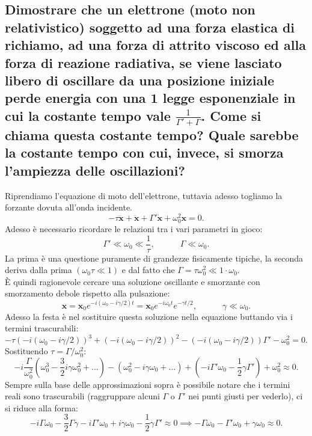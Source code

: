 \subsection[]{Dimostrare che un elettrone (moto non relativistico) soggetto ad una forza elastica di richiamo, ad una forza di attrito viscoso ed alla forza di reazione radiativa, se viene lasciato libero di oscillare da una posizione iniziale perde energia con una 1 legge esponenziale in cui la costante tempo vale $\frac{1}{\Gamma' + \Gamma}$. Come si chiama questa costante tempo? Quale sarebbe la costante tempo con cui, invece, si smorza l'ampiezza delle oscillazioni?}
Riprendiamo l'equazione di moto dell'elettrone, tuttavia adesso togliamo la forzante dovuta all'onda incidente.
\[
	- \tau \dddot{\boldsymbol{x}} + \ddot{\boldsymbol{x}} + \Gamma' \dot{\boldsymbol{x}} + \omega_0^2 \boldsymbol{x} = 0 
.\]  
Adesso è necessario ricordare le relazioni tra i vari parametri in gioco:
\[
	\Gamma' \ll \omega_0 \ll \frac{1}{\tau}, \quad \quad \quad  
	\Gamma \ll \omega_0
.\] 
La prima è una questione puramente di grandezze fisicamente tipiche, la seconda deriva dalla prima $\left( \omega_0 \tau \ll 1 \right) $ e dal fatto che $\Gamma = \tau \omega_0^2 \ll 1 \cdot \omega_0$.\\
È quindi ragionevole cercare una soluzione oscillante e smorzante con smorzamento debole rispetto alla pulsazione:
\[
	\boldsymbol{x} = \boldsymbol{x}_0 e^{-i\left( \omega_0 - i \gamma/2 \right)t } = \boldsymbol{x}_0 e^{-i \omega_0t} e^{-\gamma t /2}, \quad \quad \quad 
	\gamma \ll \omega_0
.\]
Adesso la festa è nel sostituire questa soluzione nella equazione buttando via i termini trascurabili:
\[
	- \tau \left( -i\left( \omega_0 - i \gamma /2 \right)  \right)^3 + \left( -i\left( \omega_0 - i \gamma /2 \right) \right)^2 - \left( -i\left( \omega_0 - i \gamma /2 \right) \right) \Gamma' - \omega_0^2 = 0 
.\]
Sostituendo $\tau = \Gamma / \omega_0^2$:
\[
	-i \frac{\Gamma}{\omega_0^2}\left( \omega_0^3 - \frac{3}{2} i \gamma \omega_0^2 + \ldots \right) - \left( \omega_0^2 - i \gamma \omega_0 + \ldots \right) + 
	\left( -i \Gamma' \omega_0 - \frac{1}{2} \gamma \Gamma'  \right) + \omega_0^2 \approx 0 
.\] 
Sempre sulla base delle approssimazioni sopra è possibile notare che i termini reali sono trascurabili (raggruppare alcuni $\Gamma$ o $\Gamma'$ nei punti giusti per vederlo), ci si riduce alla forma:
\[
	-i \Gamma \omega_0 - \frac{3}{2} \Gamma \gamma - i \Gamma' \omega_0 + i \gamma \omega_0 - \frac{1}{2} \gamma \Gamma' \approx 0 \implies 
	- \Gamma \omega_0 - \Gamma' \omega_0 + \gamma \omega_0 \approx 0 
.\] 
